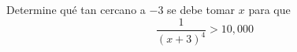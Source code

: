 \item Determine qué tan cercano a $-3$ se debe tomar $x$ para que 
    $$\frac{1}{(x + 3)^4} > 10,000$$
